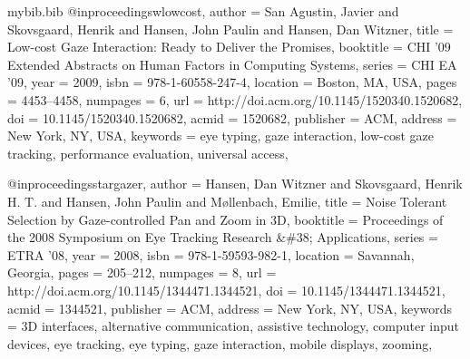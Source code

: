 \documentclass[a4paper, titlepage]{article}
\renewcommand{\%}{\scalebox{.9}{\oldpct}}
\begin{document}
\begin{filecontents}{mybib.bib}
@inproceedings{wlowcost,
 author = {San Agustin, Javier and Skovsgaard, Henrik and Hansen, John Paulin and Hansen, Dan Witzner},
 title = {Low-cost Gaze Interaction: Ready to Deliver the Promises},
 booktitle = {CHI '09 Extended Abstracts on Human Factors in Computing Systems},
 series = {CHI EA '09},
 year = {2009},
 isbn = {978-1-60558-247-4},
 location = {Boston, MA, USA},
 pages = {4453--4458},
 numpages = {6},
 url = {http://doi.acm.org/10.1145/1520340.1520682},
 doi = {10.1145/1520340.1520682},
 acmid = {1520682},
 publisher = {ACM},
 address = {New York, NY, USA},
 keywords = {eye typing, gaze interaction, low-cost gaze tracking, performance evaluation, universal access},
}

@inproceedings{stargazer,
 author = {Hansen, Dan Witzner and Skovsgaard, Henrik H. T. and Hansen, John Paulin and M{\o}llenbach, Emilie},
 title = {Noise Tolerant Selection by Gaze-controlled Pan and Zoom in 3D},
 booktitle = {Proceedings of the 2008 Symposium on Eye Tracking Research \&\#38; Applications},
 series = {ETRA '08},
 year = {2008},
 isbn = {978-1-59593-982-1},
 location = {Savannah, Georgia},
 pages = {205--212},
 numpages = {8},
 url = {http://doi.acm.org/10.1145/1344471.1344521},
 doi = {10.1145/1344471.1344521},
 acmid = {1344521},
 publisher = {ACM},
 address = {New York, NY, USA},
 keywords = {3D interfaces, alternative communication, assistive technology, computer input devices, eye tracking, eye typing, gaze interaction, mobile displays, zooming},
}
\end{filecontents}

\clearpage


\end{document}
